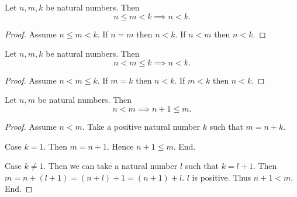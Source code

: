 \documentclass[../arithmetic.tex]{subfiles}
\begin{document}
  \begin{forthel}
    \begin{proposition}
      Let $n, m, k$ be natural numbers.
      Then \[ n \leq m < k \implies n < k. \]
    \end{proposition}
    \begin{proof}
      Assume $n \leq m < k$.
      If $n = m$ then $n < k$.
      If $n < m$ then $n < k$.
    \end{proof}
  \end{forthel}

  \begin{forthel}
    \begin{proposition}
      Let $n, m, k$ be natural numbers.
      Then \[ n < m \leq k \implies n < k. \]
    \end{proposition}
    \begin{proof}
      Assume $n < m \leq k$.
      If $m = k$ then $n < k$.
      If $m < k$ then $n < k$.
    \end{proof}
  \end{forthel}

  \begin{forthel}
    \begin{proposition}
      Let $n, m$ be natural numbers.
      Then \[ n < m \implies n + 1 \leq m. \]
    \end{proposition}
    \begin{proof}
      Assume $n < m$.
      Take a positive natural number $k$ such that $m = n + k$.

      Case $k = 1$.
        Then $m = n + 1$.
        Hence $n + 1 \leq m$.
      End.

      Case $k \neq 1$.
        Then we can take a natural number $l$ such that $k = l + 1$.
        Then $m
          = n + (l + 1)
          = (n + l) + 1
          = (n + 1) + l$.
        $l$ is positive.
        Thus $n + 1 < m$.
      End.
    \end{proof}
  \end{forthel}
\end{document}
